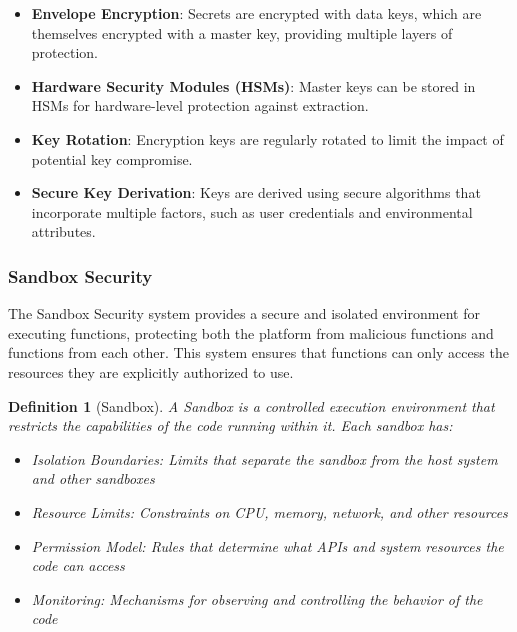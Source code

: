 \documentclass{article}
\newtheorem{definition}{Definition}
\begin{document}
\begin{itemize}
    \item \textbf{Envelope Encryption}: Secrets are encrypted with data keys, which are themselves encrypted with a master key, providing multiple layers of protection.
    
    \item \textbf{Hardware Security Modules (HSMs)}: Master keys can be stored in HSMs for hardware-level protection against extraction.
    
    \item \textbf{Key Rotation}: Encryption keys are regularly rotated to limit the impact of potential key compromise.
    
    \item \textbf{Secure Key Derivation}: Keys are derived using secure algorithms that incorporate multiple factors, such as user credentials and environmental attributes.
\end{itemize}

\subsubsection{Sandbox Security}
\label{subsubsec:sandbox}

The Sandbox Security system provides a secure and isolated environment for executing functions, protecting both the platform from malicious functions and functions from each other. This system ensures that functions can only access the resources they are explicitly authorized to use.



\begin{definition}[Sandbox]
A Sandbox is a controlled execution environment that restricts the capabilities of the code running within it. Each sandbox has:
\begin{itemize}
    \item Isolation Boundaries: Limits that separate the sandbox from the host system and other sandboxes
    \item Resource Limits: Constraints on CPU, memory, network, and other resources
    \item Permission Model: Rules that determine what APIs and system resources the code can access
    \item Monitoring: Mechanisms for observing and controlling the behavior of the code
\end{itemize}
\end{definition}
\end{document}
